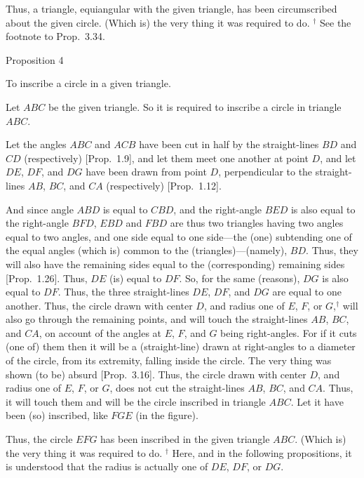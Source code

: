 Thus,  a triangle, equiangular with  the given triangle, has been circumscribed about the given
circle. (Which is) the very thing it was required to do.
{\footnotesize \noindent$^\dag$ See the footnote
to Prop.~3.34.}


\begin{center}
{\large Proposition 4}
\end{center}

To inscribe a circle in a given triangle.

\epsfysize=2in
\centerline{}

Let $ABC$ be the given triangle. So it is required to inscribe
a circle in triangle $ABC$.

Let the angles $ABC$ and $ACB$ have been cut in half by the
straight-lines $BD$ and $CD$ (respectively) [Prop.~1.9], and let them meet one another
at point $D$, and let $DE$, $DF$, and $DG$ have been drawn from
point $D$, perpendicular to the straight-lines $AB$, $BC$, and $CA$ (respectively) [Prop.~1.12].

And since angle $ABD$ is equal to $CBD$, and the right-angle
$BED$ is also equal to the right-angle $BFD$, $EBD$ and $FBD$ are thus two triangles
having two angles equal to two angles, and one side equal to one side---the
(one) subtending one of the equal angles (which is) common to the (triangles)---(namely), $BD$. Thus, they will also have the 
remaining sides equal to the (corresponding) remaining sides [Prop.~1.26]. Thus, $DE$ (is)
equal to $DF$. So, for the same (reasons), $DG$ is also equal
to $DF$. Thus, the three straight-lines $DE$, $DF$, and $DG$ are equal to one another.
Thus, the circle drawn with center $D$, and radius one of $E$, $F$, or $G$,$^\dag$ will also
go through the remaining points, and will  touch the straight-lines $AB$, $BC$, and $CA$, on account of the angles at $E$, $F$, and $G$ being right-angles. For if it cuts (one of) them then it will be a (straight-line)
drawn at right-angles to a diameter of the circle, from its extremity, falling inside
the circle. The very thing was shown (to be) absurd [Prop.~3.16].
Thus, the circle drawn with center $D$, and radius one of $E$, $F$, or $G$,
does not cut the straight-lines $AB$, $BC$, and $CA$. Thus, it will
touch them and will be the circle inscribed  in triangle $ABC$.
Let it have been (so) inscribed, like $FGE$ (in the figure).

Thus, the circle $EFG$ has been inscribed in the given triangle $ABC$.
(Which is) the very thing it was required to do.
{\footnotesize \noindent$^\dag$ Here, and in the following propositions, it
is understood that the radius is actually one of $DE$, $DF$, or $DG$.} 

